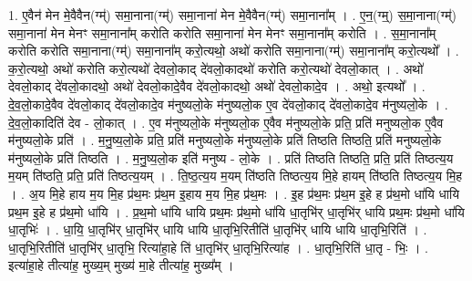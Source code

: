 \documentclass[17pt]{extarticle}
\begin{document}
1. ए॒वैन॑ मेन मे॒वैवैन(ग्म्॑) समा॒नाना(ग्म्॑) समा॒नाना॑ मेन मे॒वैवैन(ग्म्॑) समा॒नाना᳚म् । . ए॒न॒(ग्म्॒) स॒मा॒नाना(ग्म्॑) समा॒नाना॑ मेन मेनꣳ समा॒नाना᳚म् करोति करोति समा॒नाना॑ मेन मेनꣳ समा॒नाना᳚म् करोति । . स॒मा॒नाना᳚म् करोति करोति समा॒नाना(ग्म्॑) समा॒नाना᳚म् करो॒त्यथो॒ अथो॑ करोति समा॒नाना(ग्म्॑) समा॒नाना᳚म् करो॒त्यथो᳚ । . क॒रो॒त्यथो॒ अथो॑ करोति करो॒त्यथो॑ देवलो॒काद् दे॑वलो॒कादथो॑ करोति करो॒त्यथो॑ देवलो॒कात् । . अथो॑ देवलो॒काद् दे॑वलो॒कादथो॒ अथो॑ देवलो॒कादे॒वैव दे॑वलो॒कादथो॒ अथो॑ देवलो॒कादे॒व । . अथो॒ इत्यथो᳚ । . दे॒व॒लो॒कादे॒वैव दे॑वलो॒काद् दे॑वलो॒कादे॒व म॑नुष्यलो॒के म॑नुष्यलो॒क ए॒व दे॑वलो॒काद् दे॑वलो॒कादे॒व म॑नुष्यलो॒के । . दे॒व॒लो॒कादिति॑ देव - लो॒कात् । . ए॒व म॑नुष्यलो॒के म॑नुष्यलो॒क ए॒वैव म॑नुष्यलो॒के प्रति॒ प्रति॑ मनुष्यलो॒क ए॒वैव म॑नुष्यलो॒के प्रति॑ । . म॒नु॒ष्य॒लो॒के प्रति॒ प्रति॑ मनुष्यलो॒के म॑नुष्यलो॒के प्रति॑ तिष्ठति तिष्ठति॒ प्रति॑ मनुष्यलो॒के म॑नुष्यलो॒के प्रति॑ तिष्ठति । . म॒नु॒ष्य॒लो॒क इति॑ मनुष्य - लो॒के । . प्रति॑ तिष्ठति तिष्ठति॒ प्रति॒ प्रति॑ तिष्ठत्य॒य म॒यम् ति॑ष्ठति॒ प्रति॒ प्रति॑ तिष्ठत्य॒यम् । . ति॒ष्ठ॒त्य॒य म॒यम् ति॑ष्ठति तिष्ठत्य॒य मि॒हे हायम् ति॑ष्ठति तिष्ठत्य॒य मि॒ह । . अ॒य मि॒हे हाय म॒य मि॒ह प्र॑थ॒मः प्र॑थ॒म इ॒हाय म॒य मि॒ह प्र॑थ॒मः । . इ॒ह प्र॑थ॒मः प्र॑थ॒म इ॒हे ह प्र॑थ॒मो धा॑यि धायि प्रथ॒म इ॒हे ह प्र॑थ॒मो धा॑यि । . प्र॒थ॒मो धा॑यि धायि प्रथ॒मः प्र॑थ॒मो धा॑यि धा॒तृभि॑र् धा॒तृभि॑र् धायि प्रथ॒मः प्र॑थ॒मो धा॑यि धा॒तृभिः॑ । . धा॒यि॒ धा॒तृभि॑र् धा॒तृभि॑र् धायि धायि धा॒तृभि॒रितीति॑ धा॒तृभि॑र् धायि धायि धा॒तृभि॒रिति॑ । . धा॒तृभि॒रितीति॑ धा॒तृभि॑र् धा॒तृभि॒ रित्या॑हा॒हे ति॑ धा॒तृभि॑र् धा॒तृभि॒रित्या॑ह । . धा॒तृभि॒रिति॑ धा॒तृ - भिः॒ । . इत्या॑हा॒हे तीत्या॑ह॒ मुख्य॒म् मुख्य॑ मा॒हे तीत्या॑ह॒ मुख्य᳚म् । \newline
\end{document}
